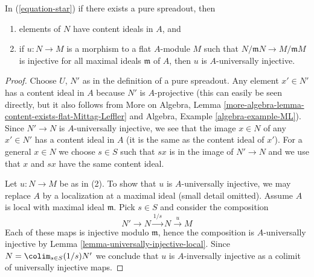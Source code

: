 \begin{lemma}
\label{lemma-properties-pure-spreadout}
In (\ref{equation-star}) if there exists a pure spreadout, then
\begin{enumerate}
\item elements of $N$ have content ideals in $A$, and
\item if $u : N \to M$ is a morphism to a flat $A$-module $M$
such that $N/\mathfrak m N \to M/\mathfrak m M$ is injective
for all maximal ideals $\mathfrak m$ of $A$, then $u$ is
$A$-universally injective.
\end{enumerate}
\end{lemma}

\begin{proof}
Choose $U$, $N'$ as in the definition of a pure spreadout.
Any element $x' \in N'$ has a content ideal in $A$ because
$N'$ is $A$-projective (this can easily be seen directly, but
it also follows from More on Algebra, Lemma
\ref{more-algebra-lemma-content-exists-flat-Mittag-Leffler} and
Algebra, Example \ref{algebra-example-ML}).
Since $N' \to N$ is $A$-universally injective, we see that
the image $x \in N$ of any $x' \in N'$ has a content ideal in $A$
(it is the same as the content ideal of $x'$).
For a general $x \in N$ we choose $s \in S$ such that
$s x$ is in the image of $N' \to N$ and we use that $x$ and $sx$
have the same content ideal.

\medskip\noindent
Let $u : N \to M$ be as in (2). To show that $u$ is $A$-universally
injective, we may replace $A$ by a localization at a maximal ideal
(small detail omitted). Assume $A$ is local with maximal ideal $\mathfrak m$.
Pick $s \in S$ and consider the composition
$$
N' \to N \xrightarrow{1/s} N \xrightarrow{u} M
$$
Each of these maps is injective modulo $\mathfrak m$, hence the composition
is $A$-universally injective by
Lemma \ref{lemma-universally-injective-local}.
Since $N = \colim_{s \in S} (1/s)N'$ we conclude that $u$
is $A$-inversally injective as a colimit of universally injective maps.
\end{proof}
